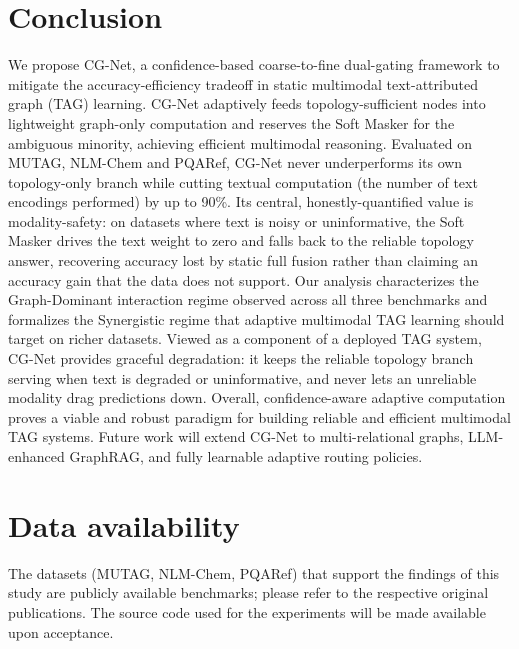 \documentclass[preprint,12pt,authoryear]{elsarticle}
\begin{document}
\section{Conclusion}
We propose CG-Net, a confidence-based coarse-to-fine dual-gating framework to mitigate the accuracy-efficiency tradeoff in static multimodal text-attributed graph (TAG) learning. CG-Net adaptively feeds topology-sufficient nodes into lightweight graph-only computation and reserves the Soft Masker for the ambiguous minority, achieving efficient multimodal reasoning. Evaluated on MUTAG, NLM-Chem and PQARef, CG-Net never underperforms its own topology-only branch while cutting textual computation (the number of text encodings performed) by up to 90\%. Its central, honestly-quantified value is modality-safety: on datasets where text is noisy or uninformative, the Soft Masker drives the text weight to zero and falls back to the reliable topology answer, recovering accuracy lost by static full fusion rather than claiming an accuracy gain that the data does not support. Our analysis characterizes the Graph-Dominant interaction regime observed across all three benchmarks and formalizes the Synergistic regime that adaptive multimodal TAG learning should target on richer datasets. Viewed as a component of a deployed TAG system, CG-Net provides graceful degradation: it keeps the reliable topology branch serving when text is degraded or uninformative, and never lets an unreliable modality drag predictions down. Overall, confidence-aware adaptive computation proves a viable and robust paradigm for building reliable and efficient multimodal TAG systems. Future work will extend CG-Net to multi-relational graphs, LLM-enhanced GraphRAG, and fully learnable adaptive routing policies.

\section*{Data availability}
The datasets (MUTAG, NLM-Chem, PQARef) that support the findings of this study are publicly available benchmarks; please refer to the respective original publications. \citep{debnath1998mutag,leaman2021nlmchem,han2020pqaref}
The source code used for the experiments will be made available upon acceptance.



\end{document}
